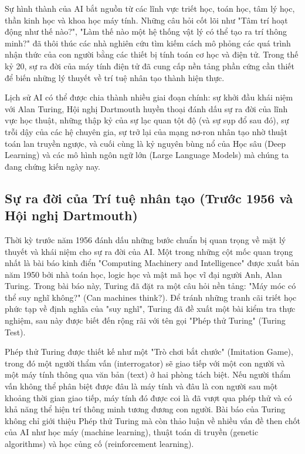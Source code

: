 \documentclass[12pt,a4paper]{article}
\begin{document}
Sự hình thành của AI bắt nguồn từ các lĩnh vực triết học, toán học, tâm lý học, thần kinh học và khoa học máy tính. Những câu hỏi cốt lõi như "Tâm trí hoạt động như thế nào?", "Làm thế nào một hệ thống vật lý có thể tạo ra trí thông minh?" đã thôi thúc các nhà nghiên cứu tìm kiếm cách mô phỏng các quá trình nhận thức của con người bằng các thiết bị tính toán cơ học và điện tử. Trong thế kỷ 20, sự ra đời của máy tính điện tử đã cung cấp nền tảng phần cứng cần thiết để biến những lý thuyết về trí tuệ nhân tạo thành hiện thực. 

Lịch sử AI có thể được chia thành nhiều giai đoạn chính: sự khởi đầu khái niệm với Alan Turing, Hội nghị Dartmouth huyền thoại đánh dấu sự ra đời của lĩnh vực học thuật, những thập kỷ của sự lạc quan tột độ (và sự sụp đổ sau đó), sự trỗi dậy của các hệ chuyên gia, sự trở lại của mạng nơ-ron nhân tạo nhờ thuật toán lan truyền ngược, và cuối cùng là kỷ nguyên bùng nổ của Học sâu (Deep Learning) và các mô hình ngôn ngữ lớn (Large Language Models) mà chúng ta đang chứng kiến ngày nay.

\newpage

\subsection{Sự ra đời của Trí tuệ nhân tạo (Trước 1956 và Hội nghị Dartmouth)}

Thời kỳ trước năm 1956 đánh dấu những bước chuẩn bị quan trọng về mặt lý thuyết và khái niệm cho sự ra đời của AI. Một trong những cột mốc quan trọng nhất là bài báo kinh điển "Computing Machinery and Intelligence" được xuất bản năm 1950 bởi nhà toán học, logic học và mật mã học vĩ đại người Anh, Alan Turing. Trong bài báo này, Turing đã đặt ra một câu hỏi nền tảng: "Máy móc có thể suy nghĩ không?" (Can machines think?). Để tránh những tranh cãi triết học phức tạp về định nghĩa của "suy nghĩ", Turing đã đề xuất một bài kiểm tra thực nghiệm, sau này được biết đến rộng rãi với tên gọi "Phép thử Turing" (Turing Test).

Phép thử Turing được thiết kế như một "Trò chơi bắt chước" (Imitation Game), trong đó một người thẩm vấn (interrogator) sẽ giao tiếp với một con người và một máy tính thông qua văn bản (text) ở hai phòng tách biệt. Nếu người thẩm vấn không thể phân biệt được đâu là máy tính và đâu là con người sau một khoảng thời gian giao tiếp, máy tính đó được coi là đã vượt qua phép thử và có khả năng thể hiện trí thông minh tương đương con người. Bài báo của Turing không chỉ giới thiệu Phép thử Turing mà còn thảo luận về nhiều vấn đề then chốt của AI như học máy (machine learning), thuật toán di truyền (genetic algorithms) và học củng cố (reinforcement learning).
\end{document}
